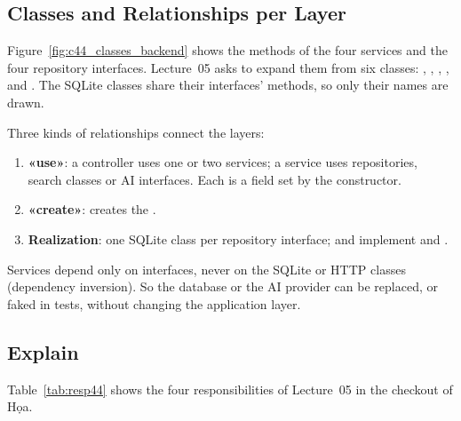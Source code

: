 \subsection{Classes and Relationships per Layer}\label{sec:4.4.2}

Figure~\ref{fig:c44_classes_backend} shows the methods of the four services and the four repository interfaces.
Lecture~05 asks to expand them from six classes: , , ,
,  and . The SQLite classes share their interfaces'
methods, so only their names are drawn.


Three kinds of relationships connect the layers:
\begin{enumerate}
\item \textbf{«use»}: a controller uses one or two services; a service uses repositories, search classes or AI
interfaces. Each is a field set by the constructor.
\item \textbf{«create»}:  creates the .
\item \textbf{Realization}: one SQLite class per repository interface;  and 
implement  and .
\end{enumerate}
Services depend only on interfaces, never on the SQLite or HTTP classes (dependency inversion). So the database or
the AI provider can be replaced, or faked in tests, without changing the application layer.

\subsection{Explain}\label{sec:4.4.3}

Table~\ref{tab:resp44} shows the four responsibilities of Lecture~05 in the checkout of Họa.

